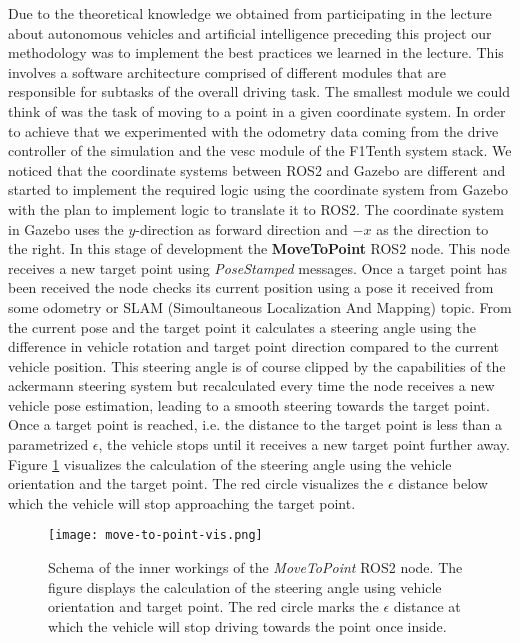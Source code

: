 Due to the theoretical knowledge we obtained from participating in the lecture about autonomous vehicles and artificial intelligence preceding this project our methodology was to implement the best practices we learned in the lecture. This involves a software architecture comprised of different modules that are responsible for subtasks of the overall driving task. The smallest module we could think of was the task of moving to a point in a given coordinate system. In order to achieve that we experimented with the odometry data coming from the drive controller of the simulation and the vesc module of the F1Tenth system stack. We noticed that the coordinate systems between ROS2 and Gazebo are different and started to implement the required logic using the coordinate system from Gazebo with the plan to implement logic to translate it to ROS2. The coordinate system in Gazebo uses the $y$-direction as forward direction and $-x$ as the direction to the right. In this stage of development the \textbf{MoveToPoint} ROS2 node. This node receives a new target point using \textit{PoseStamped} messages. Once a target point has been received the node checks its current position using a pose it received from some odometry or SLAM (Simoultaneous Localization And Mapping) topic. From the current pose and the target point it calculates a steering angle using the difference in vehicle rotation and target point direction compared to the current vehicle position. This steering angle is of course clipped by the capabilities of the ackermann steering system but recalculated every time the node receives a new vehicle pose estimation, leading to a smooth steering towards the target point. Once a target point is reached, i.e. the distance to the target point is less than a parametrized $\epsilon$, the vehicle stops until it receives a new target point further away.
Figure \ref{fig:move-to-point} visualizes the calculation of the steering angle using the vehicle orientation and the target point. The red circle visualizes the $\epsilon$ distance below which the vehicle will stop approaching the target point.

\begin{figure}[ht]
\vskip 0.2in
\begin{center}
\centerline{\texttt{[image: move-to-point-vis.png]}}
\caption{Schema of the inner workings of the \textit{MoveToPoint} ROS2 node. The figure displays the calculation of the steering angle using vehicle orientation and target point. The red circle marks the $\epsilon$ distance at which the vehicle will stop driving towards the point once inside.}
\label{fig:move-to-point}
\end{center}
\vskip -0.2in
\end{figure}

